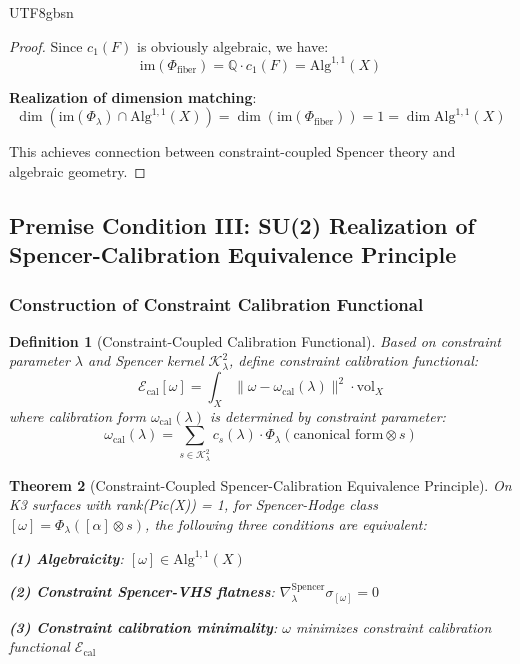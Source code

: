 \documentclass[a4paper,12pt]{extarticle}
\newtheorem{theorem}{Theorem}[section]
\newtheorem{definition}[theorem]{Definition}
\theoremstyle{definition}
\begin{document}
\begin{CJK}{UTF8}{gbsn}
\begin{proof}
Since $c_1(F)$ is obviously algebraic, we have:
$$\text{im}(\Phi_{\text{fiber}}) = \mathbb{Q} \cdot c_1(F) = \text{Alg}^{1,1}(X)$$

\textbf{Realization of dimension matching}:
$$\dim(\text{im}(\Phi_\lambda) \cap \text{Alg}^{1,1}(X)) = \dim(\text{im}(\Phi_{\text{fiber}})) = 1 = \dim \text{Alg}^{1,1}(X)$$

This achieves connection between constraint-coupled Spencer theory and algebraic geometry.
\end{proof}

\subsection{Premise Condition III: SU(2) Realization of Spencer-Calibration Equivalence Principle}
\label{subsec:premise_III_spencer_calibration}

\subsubsection{Construction of Constraint Calibration Functional}
\label{subsubsec:constraint_calibration_functional}

\begin{definition}[Constraint-Coupled Calibration Functional]
\label{def:constraint_calibration_functional}
Based on constraint parameter $\lambda$ and Spencer kernel $\mathcal{K}^2_\lambda$, define constraint calibration functional:
$$\mathcal{E}_{\text{cal}}[\omega] = \int_X \|\omega - \omega_{\text{cal}}(\lambda)\|^2 \cdot \text{vol}_X$$
where calibration form $\omega_{\text{cal}}(\lambda)$ is determined by constraint parameter:
$$\omega_{\text{cal}}(\lambda) = \sum_{s \in \mathcal{K}^2_\lambda} c_s(\lambda) \cdot \Phi_\lambda(\text{canonical form} \otimes s)$$
\end{definition}

\begin{theorem}[Constraint-Coupled Spencer-Calibration Equivalence Principle]
\label{thm:constraint_spencer_calibration_equivalence}
On K3 surfaces with rank(Pic(X)) = 1, for Spencer-Hodge class $[\omega] = \Phi_\lambda([\alpha] \otimes s)$, the following three conditions are equivalent:

\textbf{(1) Algebraicity}: $[\omega] \in \text{Alg}^{1,1}(X)$

\textbf{(2) Constraint Spencer-VHS flatness}: $\nabla^{\text{Spencer}}_\lambda \sigma_{[\omega]} = 0$

\textbf{(3) Constraint calibration minimality}: $\omega$ minimizes constraint calibration functional $\mathcal{E}_{\text{cal}}$


\end{theorem}
\end{CJK}
\end{document}
